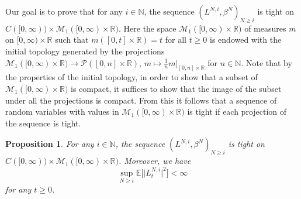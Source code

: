 \documentclass[11pt, a4paper]{article}
\theoremstyle{plain}
\newtheorem{proposition}[theorem]{Proposition}
\theoremstyle{definition}
\theoremstyle{remark}
\numberwithin{equation}{section}
\newcommand{\ev}{\mathbb{E}}
\newcommand{\R}{\mathbb{R}}
\renewcommand{\P}{\mathcal{P}}
\newcommand{\bb}[1]{\mathbb{#1}}
\renewcommand{\cal}[1]{\mathcal{#1}}
\begin{document}
Our goal is to prove that for any $i \in \bb{N}$, the sequence $(L^{N, i}, \beta^N)_{N \geq i}$ is tight on $C([0, \infty)) \times \cal{M}_1([0, \infty) \times \R)$. Here the space $\cal{M}_1([0, \infty) \times \R)$ of measures $m$ on $[0, \infty) \times \R$ such that $m([0, t] \times \R) = t$ for all $t \geq 0$ is endowed with the initial topology generated by the projections $\cal{M}_1([0, \infty) \times \R) \to \P([0, n] \times \R)$, $m \mapsto \frac{1}{n} m\vert_{[0, n] \times \R}$ for $n \in \bb{N}$. Note that by the properties of the initial topology, in order to show that a subset of $\cal{M}_1([0, \infty) \times \R)$ is compact, it suffices to show that the image of the subset under all the projections is compact. From this it follows that a sequence of random variables with values in $\cal{M}_1([0, \infty) \times \R)$ is tight if each projection of the sequence is tight.

\begin{proposition} \label{prop:tightness_ps}
For any $i \in \bb{N}$, the sequence $(L^{N, i}, \beta^N)_{N \geq i}$ is tight on $C([0, \infty)) \times \cal{M}_1([0, \infty) \times \R)$. Moreover, we have
\begin{equation} \label{eq:regulator_square_int}
    \sup_{N \geq i} \ev\bigl[\lvert L^{N, i}_t\rvert^2\bigr] < \infty
\end{equation}
for any $t \geq 0$.
\end{proposition}
\end{document}
